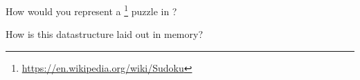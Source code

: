 How would you represent a \footnote{\url{https://en.wikipedia.org/wiki/Sudoku}} puzzle in \csharp?

How is this datastructure laid out in memory?
